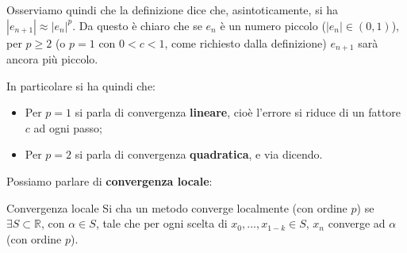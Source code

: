 \documentclass[a4paper,11pt]{article}
\begin{document}
Osserviamo quindi che la definizione dice che, asintoticamente, si ha $|e_{n + 1}| \approx |e_n|^p$.
Da questo è chiaro che se $e_{n}$ è un numero piccolo ($|e_n| \in (0, 1)$), per $p \geq 2$ (o $p = 1$ con $0 < c < 1$, come richiesto dalla definizione) $e_{n + 1}$ sarà ancora più piccolo.

In particolare si ha quindi che:
\begin{itemize}
	\item Per $p = 1$ si parla di convergenza \textbf{lineare}, cioè l'errore si riduce di un fattore $c$ ad ogni passo;
	\item Per $p = 2$ si parla di convergenza \textbf{quadratica}, e via dicendo.
\end{itemize}

Possiamo parlare di \textbf{convergenza locale}:
\begin{definition}{Convergenza locale}
	Si cha un metodo converge localmente (con ordine $p$) se $\exists S \subset \mathbb{R}$, con $\alpha \in S$, tale che per ogni scelta di $x_0, ..., x_{1 - k} \in S$, $x_n$ converge ad $\alpha$ (con ordine $p$).
\end{definition}
\end{document}
